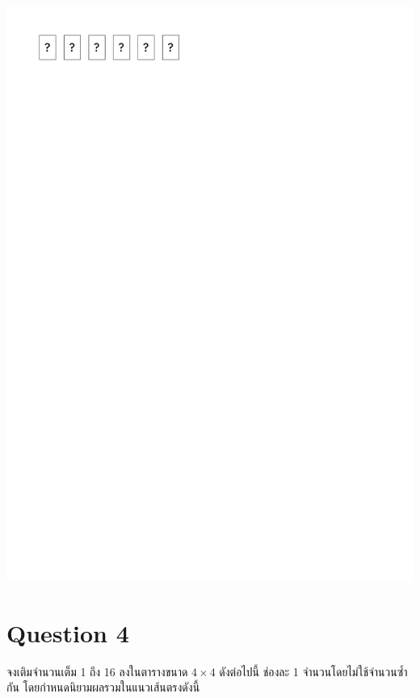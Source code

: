 \begin{minipage}{0.525\linewidth}
    \begin{center}
        \includegraphics[page=3]{figures/puzzle.pdf}
    \end{center}    
\end{minipage}


\section{Question 4}

จงเติมจำนวนเต็ม 1 ถึง 16 ลงในตารางขนาด $4 \times 4$ ดังต่อไปนี้ ช่องละ 1 จำนวนโดยไม่ใช้จำนวนซ้ำกัน โดยกำหนดนิยามผลรวมในแนวเส้นตรงดังนี้

\medskip

